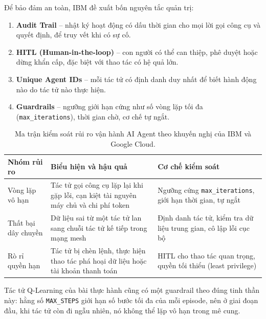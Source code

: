 Để bảo đảm an toàn, IBM đề xuất bốn nguyên tắc quản trị:
\begin{enumerate}
  \item \textbf{Audit Trail} -- nhật ký hoạt động có dấu thời gian cho mọi lời gọi công cụ và quyết định, để truy vết
        khi có sự cố.
  \item \textbf{HITL (Human-in-the-loop)} -- con người có thể can thiệp, phê duyệt hoặc dừng khẩn cấp, đặc biệt với
        thao tác có hệ quả lớn.
  \item \textbf{Unique Agent IDs} -- mỗi tác tử có định danh duy nhất để biết hành động nào do tác tử nào thực hiện.
  \item \textbf{Guardrails} -- ngưỡng giới hạn cứng như số vòng lặp tối đa (\texttt{max\_iterations}), thời gian chờ,
        cơ chế tự ngắt.
\end{enumerate}


\begin{table}[!htbp]\centering
\caption{Ma trận kiểm soát rủi ro vận hành AI Agent theo khuyến nghị của IBM và Google Cloud.}\label{tab:ch6-risk}
\small
\begin{tabularx}{\linewidth}{L{3.1cm}XX}
\toprule
\textbf{Nhóm rủi ro} & \textbf{Biểu hiện và hậu quả} & \textbf{Cơ chế kiểm soát} \\
\midrule
Vòng lặp vô hạn & Tác tử gọi công cụ lặp lại khi gặp lỗi, cạn kiệt tài nguyên máy chủ và chi phí token &
Ngưỡng cứng \texttt{max\_iterations}, giới hạn thời gian, tự ngắt \\
Thất bại dây chuyền & Dữ liệu sai từ một tác tử lan sang chuỗi tác tử kế tiếp trong mạng mesh & Định danh tác tử,
kiểm tra dữ liệu trung gian, cô lập lỗi cục bộ \\
Rò rỉ quyền hạn & Tác tử bị chèn lệnh, thực hiện thao tác phá hoại dữ liệu hoặc tài khoản thanh toán & HITL cho thao
tác quan trọng, quyền tối thiểu (least privilege) \\
\bottomrule
\end{tabularx}
\end{table}

Tác tử Q-Learning của bài thực hành cũng có một guardrail theo đúng tinh thần này: hằng số \texttt{MAX\_STEPS} giới hạn
số bước tối đa của mỗi episode, nên ở giai đoạn đầu, khi tác tử còn đi ngẫu nhiên, nó không thể lặp vô hạn trong mê cung.
